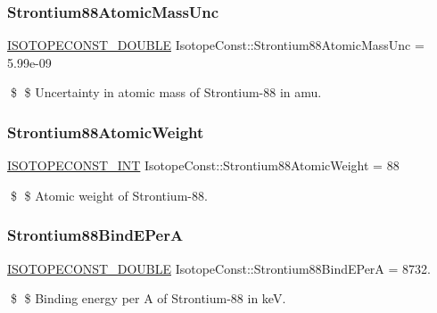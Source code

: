 \subsubsection{\texorpdfstring{Strontium88\+Atomic\+Mass\+Unc}{Strontium88AtomicMassUnc}}
{\footnotesize\ttfamily \mbox{\hyperlink{group___isotope_const-_macros_ga8f45a7272ce02c0b4c65c44636ed719a}{I\+S\+O\+T\+O\+P\+E\+C\+O\+N\+S\+T\+\_\+\+D\+O\+U\+B\+LE}} Isotope\+Const\+::\+Strontium88\+Atomic\+Mass\+Unc = 5.\+99e-\/09}

\$ \$ Uncertainty in atomic mass of Strontium-\/88 in amu. \mbox{\label{group___isotope_const-_strontium-_sr88_ga4dba916e82f83ee2fa436026942a37a1}} 
\subsubsection{\texorpdfstring{Strontium88\+Atomic\+Weight}{Strontium88AtomicWeight}}
{\footnotesize\ttfamily \mbox{\hyperlink{group___isotope_const-_macros_ga5f18360b3e99483a35c32d789e62621c}{I\+S\+O\+T\+O\+P\+E\+C\+O\+N\+S\+T\+\_\+\+I\+NT}} Isotope\+Const\+::\+Strontium88\+Atomic\+Weight = 88}

\$ \$ Atomic weight of Strontium-\/88. \mbox{\label{group___isotope_const-_strontium-_sr88_ga97b09bbbe3676360a05c589b28bac981}} 
\subsubsection{\texorpdfstring{Strontium88\+Bind\+E\+PerA}{Strontium88BindEPerA}}
{\footnotesize\ttfamily \mbox{\hyperlink{group___isotope_const-_macros_ga8f45a7272ce02c0b4c65c44636ed719a}{I\+S\+O\+T\+O\+P\+E\+C\+O\+N\+S\+T\+\_\+\+D\+O\+U\+B\+LE}} Isotope\+Const\+::\+Strontium88\+Bind\+E\+PerA = 8732.}

\$ \$ Binding energy per A of Strontium-\/88 in keV. \mbox{\label{group___isotope_const-_strontium-_sr88_gad9e756de81210a21abb843d3c266f0e0}} 
